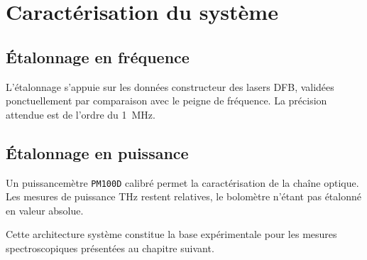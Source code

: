 \section{Caractérisation du système}

\subsection{Étalonnage en fréquence}

L'étalonnage s'appuie sur les données constructeur des lasers DFB, validées ponctuellement par comparaison avec le peigne de fréquence. La précision attendue est de l'ordre du \SI{1}{\MHz}.

\subsection{Étalonnage en puissance}

Un puissancemètre \texttt{PM100D} calibré permet la caractérisation de la chaîne optique. Les mesures de puissance THz restent relatives, le bolomètre n'étant pas étalonné en valeur absolue.

Cette architecture système constitue la base expérimentale pour les mesures spectroscopiques présentées au chapitre suivant.